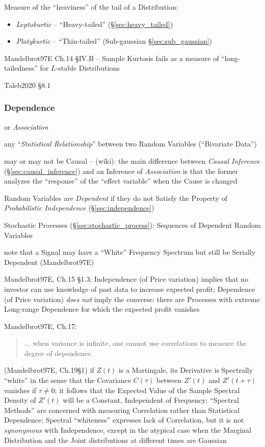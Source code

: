 Measure of the ``heaviness'' of the tail of a Distribution:

\begin{itemize}
  \item \emph{Leptokurtic} -- ``Heavy-tailed'' (\S\ref{sec:heavy_tailed})
  \item \emph{Platykurtic} -- ``Thin-tailed'' (Sub-gaussian
    \S\ref{sec:sub_gaussian})
\end{itemize}

Mandelbrot97E Ch.14 \S IV.B -- Sample Kurtosis fails as a measure of
``long-tailedness'' for $L$-stable Distributions

Taleb2020 \S 8.1



\subsubsection{Dependence}\label{sec:dependence}

or \emph{Association}

any ``\emph{Statistical Relationship}'' between two Random Variables
(``Bivariate Data'')

may or may not be Causal -- (wiki): the main difference between
\emph{Causal Inference} (\S\ref{sec:causal_inference}) and an Inference of
\emph{Association} is that the former analyzes the ``response'' of the ``effect
variable'' when the Cause is changed

Random Variables are \emph{Dependent} if they do not Satisfy the Property of
\emph{Probabilistic Independence} (\S\ref{sec:independence})

Stochastic Processes (\S\ref{sec:stochastic_process}): Sequences of Dependent
Random Variables

note that a Signal may have a ``White'' Frequency Spectrum but still be Serially
Dependent (Mandelbrot97E)

Mandelbrot97E, Ch.15 \S 1.3: Independence (of Price variation) implies that no
investor can use knowledge of past data to increase expected profit; Dependence
(of Price variation) \emph{does not} imply the converse: there are Processes
with extreme Long-range Dependence for which the expected profit vanishes

Mandelbrot97E, Ch.17:
\begin{quote}
  ... when variance is infinite, one cannot use correlations to measure the
  degree of dependence.
\end{quote}

(Mandelbrot97E, Ch.19\S 1) if $Z(t)$ is a Martingale, its Derivative is
Spectrally ``white'' in the sense that the Covariance $C(\tau)$ between $Z'(t)$
and $Z'(t + \tau)$ vanishes if $\tau \neq 0$; it follows that the Expected Value
of the Sample Spectral Density of $Z'(t)$ will be a Constant, Independent of
Frequency; ``Spectral Methods'' are concerned with measuring Correlation rather
than Statistical Dependence; Spectral ``whiteness'' expresses lack of
Correlation, but it is not \emph{synonymous} with Independence, except in the
atypical case when the Marginal Distribution and the Joint distributions at
different times are Gaussian

